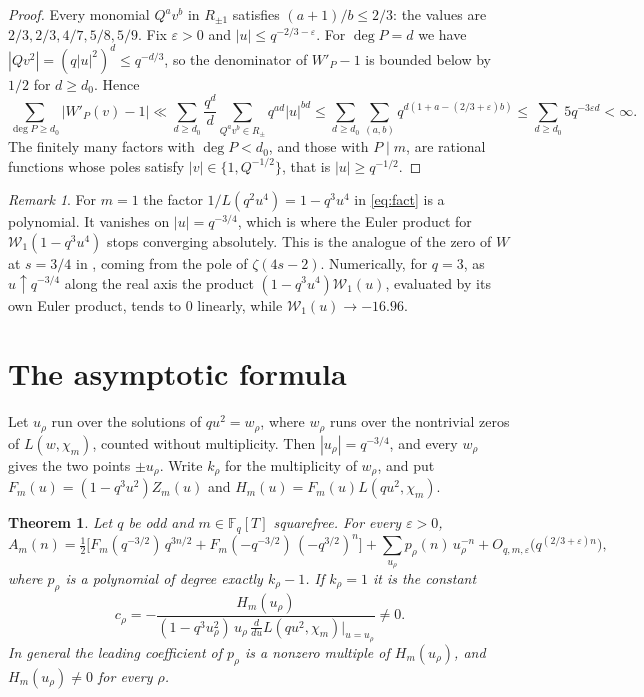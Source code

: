 \documentclass[11pt]{amsart}
\newtheorem{theorem}{Theorem}
\theoremstyle{remark}
\newtheorem{remark}{Remark}
\newcommand{\Fq}{\mathbb{F}_q}
\begin{document}
\begin{proof}
Every monomial $Q^av^b$ in $R_{\pm1}$ satisfies $(a+1)/b\le2/3$: the values are $2/3,2/3,4/7,5/8,5/9$. Fix $\varepsilon>0$ and $|u|\le q^{-2/3-\varepsilon}$. For $\deg P=d$ we have $|Qv^2|=(q|u|^2)^d\le q^{-d/3}$, so the denominator of $W'_P-1$ is bounded below by $1/2$ for $d\ge d_0$. Hence
\[
\sum_{\deg P\ge d_0}|W'_P(v)-1|\ll\sum_{d\ge d_0}\frac{q^d}{d}\sum_{Q^av^b\in R_\pm}q^{ad}|u|^{bd}\le\sum_{d\ge d_0}\sum_{(a,b)}q^{d(1+a-(2/3+\varepsilon)b)}\le\sum_{d\ge d_0}5q^{-3\varepsilon d}<\infty .
\]
The finitely many factors with $\deg P<d_0$, and those with $P\mid m$, are rational functions whose poles satisfy $|v|\in\{1,Q^{-1/2}\}$, that is $|u|\ge q^{-1/2}$.
\end{proof}

\begin{remark}
For $m=1$ the factor $1/L(q^2u^4)=1-q^3u^4$ in \eqref{eq:fact} is a polynomial. It vanishes on $|u|=q^{-3/4}$, which is where the Euler product for $\mathcal W_1(1-q^3u^4)$ stops converging absolutely. This is the analogue of the zero of $W$ at $s=3/4$ in \cite{K}, coming from the pole of $\zeta(4s-2)$. Numerically, for $q=3$, as $u\uparrow q^{-3/4}$ along the real axis the product $(1-q^3u^4)\mathcal W_1(u)$, evaluated by its own Euler product, tends to $0$ linearly, while $\mathcal W_1(u)\to-16.96$.
\end{remark}

\section{The asymptotic formula}

Let $u_\rho$ run over the solutions of $qu^2=w_\rho$, where $w_\rho$ runs over the nontrivial zeros of $L(w,\chi_m)$, counted without multiplicity. Then $|u_\rho|=q^{-3/4}$, and every $w_\rho$ gives the two points $\pm u_\rho$. Write $k_\rho$ for the multiplicity of $w_\rho$, and put $F_m(u)=(1-q^3u^2)Z_m(u)$ and $H_m(u)=F_m(u)L(qu^2,\chi_m)$.

\begin{theorem}\label{thm:main}
Let $q$ be odd and $m\in\Fq[T]$ squarefree. For every $\varepsilon>0$,
\[
A_m(n)=\tfrac12\Big[F_m(q^{-3/2})\,q^{3n/2}+F_m(-q^{-3/2})\,(-q^{3/2})^n\Big]+\sum_{u_\rho}p_\rho(n)\,u_\rho^{-n}+O_{q,m,\varepsilon}\big(q^{(2/3+\varepsilon)n}\big),
\]
where $p_\rho$ is a polynomial of degree exactly $k_\rho-1$. If $k_\rho=1$ it is the constant
\begin{equation}\label{eq:crho}
c_\rho=-\frac{H_m(u_\rho)}{(1-q^3u_\rho^2)\,u_\rho\,\frac{d}{du}L(qu^2,\chi_m)\big|_{u=u_\rho}}\neq0 .
\end{equation}
In general the leading coefficient of $p_\rho$ is a nonzero multiple of $H_m(u_\rho)$, and $H_m(u_\rho)\neq0$ for every $\rho$.
\end{theorem}
\end{document}
